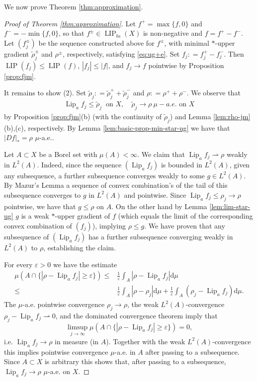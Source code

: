 \documentclass{amsart}
\numberwithin{equation}{section}
\newcommand{\Lip}{\operatorname{Lip}}
\newcommand{\LIP}{\operatorname{LIP}}
\newcommand{\ud}{\mathrm {d}}
\newcommand{\defl}{\mathrel{\mathop:}=}
\begin{document}
We now prove Theorem \ref{thm:approximation}.
\begin{proof}[Proof of Theorem \ref{thm:approximation}]
Let $f^+=\max\{f,0\}$ and $f^-=-\min\{f,0\}$, so that $f^\pm\in\LIP_{bs}(X)$ is non-negative and $f=f^+-f^-$. Let $(f_j^\pm)$ be the sequence constructed above for $f^\pm$, with minimal $\ast$-upper gradient $\tilde\rho_j^\pm$ and $\rho^\pm$, respectively, satisfying \eqref{eq:ug+e}.  Set $f_j\defl f_j^+-f_j^-$. Then $\LIP(f_j)\le \LIP(f)$,  $|f_j|\le |f|$, and $f_j\to f$ pointwise by Proposition \ref{prop:fjm}.

It remains to show (2). Set $\tilde\rho_j\defl \tilde\rho_j^++\tilde\rho_j^-$ and $\rho\defl \rho^++\rho^-$. We observe that
\begin{align}\label{squash_Lip_a}
	\Lip_af_j\le \tilde\rho_j \ \textrm{ on } X,\quad \tilde\rho_j\to \rho \ \mu-a.e. \textrm{ on }X
\end{align}
by Proposition \ref{prop:fjm}(b) (with the continuity of $\tilde\rho_j$) and Lemma \ref{lem:rho-jm}(b),(c), respectively. By Lemma \ref{lem:basic-prop-min-star-ug} we have that $|Df|_\ast=\rho$ $\mu$-a.e..

Let $A\subset X$ be a Borel set with $\mu(A)<\infty$. We claim that $\Lip_af_j\rightharpoonup \rho$ weakly in $L^2(A)$. Indeed, since the sequence $(\Lip_af_j)$ is bounded in $L^2(A)$, given any subsequence, a further subsequence converges weakly to some $g\in L^2(A)$. By Mazur's Lemma a sequence of convex combination's of the tail of this subsequence converges to $g$ in $L^2(A)$ and pointwise. Since $\Lip_af_j\le \rho_j\to \rho$ pointwise, we have that $g\le \rho$ on $A$. On the other hand by Lemma \ref{lem:lim-star-ug} $g$ is a weak $\ast$-upper gradient of $f$ (which equals the limit of the corresponding convex combination of $(f_j)$), implying $\rho\le g$. We have proven that any subsequence of $(\Lip_af_j)$ has a further subsequence converging weakly in $L^2(A)$ to $\rho$, establishing the claim. 

For every $\varepsilon>0$ we have the estimate
\begin{align*}
\mu(A\cap \{ |\rho-\Lip_af_j|\ge \varepsilon\})\le &\frac 1\varepsilon\int_A|\rho-\Lip_af_j|\ud\mu\\
\le & \frac 1\varepsilon\int_A|\rho-\rho_j|\ud\mu+\frac 1\varepsilon\int_A(\rho_j-\Lip_af_j)\ud\mu.
\end{align*}
The $\mu$-a.e. pointwise convergence $\rho_j\to \rho$, the weak $L^2(A)$-convergence $\rho_j-\Lip_af_j\rightharpoonup 0$, and the dominated convergence theorem imply that
\[
\limsup_{j\to\infty}\mu(A\cap \{ |\rho-\Lip_af_j|\ge \varepsilon\})=0,
\]
i.e. $\Lip_af_j\to \rho$ in measure (in $A$). Together with the weak $L^2(A)$-convergence this implies pointwise convergence $\mu$-a.e. in $A$ after passing to a subsequence. Since $A\subset X$ is arbitrary this shows that, after passing to a subsequence, $\Lip_af_j\to\rho$ $\mu$-a.e. on $X$. 


\end{proof}
\end{document}
